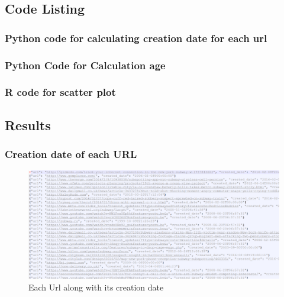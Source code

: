 \subsection{Code Listing}

\subsubsection{Python code for calculating creation date for each url}

\subsubsection{Python Code for Calculation age}

\newpage
\subsubsection{R code for scatter plot}

\subsection{Results}

\subsubsection{Creation date of each URL}
\begin{figure}[ht]    
    \begin{center}
        \includegraphics[scale=0.37]{url_creationdate.png}
        \caption{Each Url along with its creation date}
        \label{Each Url along with its creation date}
    \end{center}
\end{figure}
\newpage

